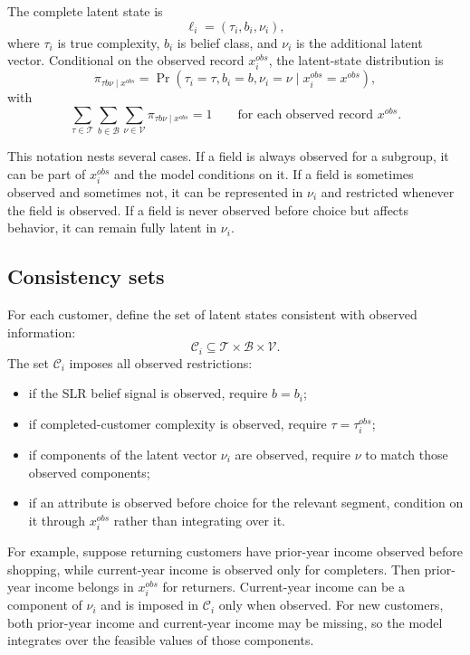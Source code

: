 \documentclass[11pt]{article}
\newcommand{\Tset}{\mathcal{T}}
\newcommand{\Bset}{\mathcal{B}}
\newcommand{\Prb}{\Pr}
\begin{document}
The complete latent state is
\[
\ell_i=(\tau_i,b_i,\nu_i),
\]
where $\tau_i$ is true complexity, $b_i$ is belief class, and $\nu_i$ is the additional latent vector. Conditional on the observed record $x_i^{obs}$, the latent-state distribution is
\[
\pi_{\tau b\nu\mid x^{obs}}
=
\Prb(\tau_i=\tau,b_i=b,\nu_i=\nu\mid x_i^{obs}=x^{obs}),
\]
with
\[
\sum_{\tau\in\Tset}\sum_{b\in\Bset}\sum_{\nu\in\mathcal V}
\pi_{\tau b\nu\mid x^{obs}}=1
\qquad \text{for each observed record }x^{obs}.
\]

This notation nests several cases. If a field is always observed for a subgroup, it can be part of $x_i^{obs}$ and the model conditions on it. If a field is sometimes observed and sometimes not, it can be represented in $\nu_i$ and restricted whenever the field is observed. If a field is never observed before choice but affects behavior, it can remain fully latent in $\nu_i$.

\subsection{Consistency sets}

For each customer, define the set of latent states consistent with observed information:
\[
\mathcal C_i\subseteq \Tset\times\Bset\times\mathcal V.
\]
The set $\mathcal C_i$ imposes all observed restrictions:
\begin{itemize}
\item if the SLR belief signal is observed, require $b=b_i$;
\item if completed-customer complexity is observed, require $\tau=\tau_i^{obs}$;
\item if components of the latent vector $\nu_i$ are observed, require $\nu$ to match those observed components;
\item if an attribute is observed before choice for the relevant segment, condition on it through $x_i^{obs}$ rather than integrating over it.
\end{itemize}

For example, suppose returning customers have prior-year income observed before shopping, while current-year income is observed only for completers. Then prior-year income belongs in $x_i^{obs}$ for returners. Current-year income can be a component of $\nu_i$ and is imposed in $\mathcal C_i$ only when observed. For new customers, both prior-year income and current-year income may be missing, so the model integrates over the feasible values of those components.
\end{document}
